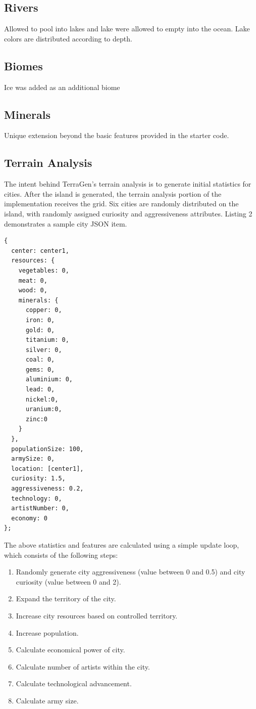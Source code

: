 \subsection{Rivers}
Allowed to pool into lakes and lake were allowed to empty into the ocean. Lake colors are distributed according to depth.

\subsection{Biomes}
Ice was added as an additional biome

\subsection{Minerals}
Unique extension beyond the basic features provided in the starter code.

\subsection{Terrain Analysis}
The intent behind TerraGen's terrain analysis is to generate initial statistics for cities. After the island is generated, the terrain analysis portion of the implementation receives the grid. Six cities are randomly distributed on the island, with randomly assigned curiosity and aggressiveness attributes. Listing 2 demonstrates a sample city JSON item.

\begin{lstlisting}[caption=JSON City Item]
{
  center: center1,
  resources: {
    vegetables: 0,
    meat: 0,
    wood: 0,
    minerals: {
      copper: 0,
      iron: 0,
      gold: 0,
      titanium: 0,
      silver: 0,
      coal: 0,
      gems: 0,
      aluminium: 0,
      lead: 0,
      nickel:0,
      uranium:0,
      zinc:0
    }
  },
  populationSize: 100,
  armySize: 0,
  location: [center1],
  curiosity: 1.5,
  aggressiveness: 0.2,
  technology: 0,
  artistNumber: 0,
  economy: 0
};
\end{lstlisting}

The above statistics and features are calculated using a simple update loop, which consists of the following steps:

\begin{enumerate}
\item Randomly generate city aggressiveness (value between 0 and 0.5) and city curiosity (value between 0 and 2).
\item Expand the territory of the city.
\item Increase city resources based on controlled territory.
\item Increase population.
\item Calculate economical power of city.
\item Calculate number of artists within the city.
\item Calculate technological advancement.
\item Calculate army size.
\end{enumerate}

